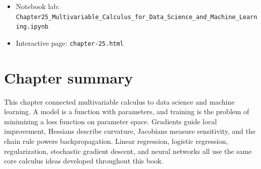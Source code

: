 \documentclass[11pt,oneside]{book}
\begin{document}
\begin{itemize}
  \item Notebook lab: \texttt{Chapter25\_Multivariable\_Calculus\_for\_Data\_Science\_and\_Machine\_Learning.ipynb}
  \item Interactive page: \texttt{chapter-25.html}
\end{itemize}

\section{Chapter summary}

This chapter connected multivariable calculus to data science and machine learning. A model is a function with parameters, and training is the problem of minimizing a loss function on parameter space. Gradients guide local improvement, Hessians describe curvature, Jacobians measure sensitivity, and the chain rule powers backpropagation. Linear regression, logistic regression, regularization, stochastic gradient descent, and neural networks all use the same core calculus ideas developed throughout this book.
\end{document}
